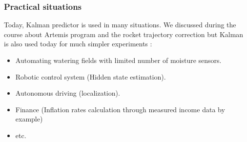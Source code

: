 \subsubsection{Practical situations}

Today, Kalman predictor is used in many situations.  We discussed during the course about Artemis program and the rocket trajectory correction but Kalman is also used today for much simpler experiments :
\begin{itemize}
    \item Automating watering fields with limited number of moisture sensors.
    \item Robotic control system (Hidden state estimation).
    \item Autonomous driving (localization).
    \item Finance (Inflation rates calculation through measured income data by example)
    \item etc.
\end{itemize}
